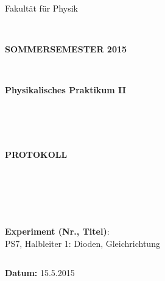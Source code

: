 \documentclass[12pt,a4paper,twopage]{article}
\begin{document}
\begin{verbatim}


\end{verbatim}

\thispagestyle{empty}
			\begin{center}
			\Large{Fakultät für Physik}\\
			\end{center}
\begin{verbatim}


\end{verbatim}
			\begin{center}
			\textbf{\LARGE SOMMERSEMESTER 2015}
			\end{center}
\begin{verbatim}


\end{verbatim}
			\begin{center}
			\textbf{\LARGE{Physikalisches Praktikum II}}
			\end{center}
\begin{verbatim}




\end{verbatim}

			\begin{center}
			\textbf{\LARGE{PROTOKOLL}}
			\end{center}
			
\begin{verbatim}





\end{verbatim}

			\begin{flushleft}
			\textbf{\Large{Experiment (Nr., Titel)}}:\\
			\Large{PS7, Halbleiter 1: Dioden, Gleichrichtung}\\
			\LARGE{}	
			\end{flushleft}

\begin{verbatim}

\end{verbatim}	
			\begin{flushleft}
			\textbf{\Large{Datum:}} \Large{15.5.2015}
			\end{flushleft}
			
\end{document}
